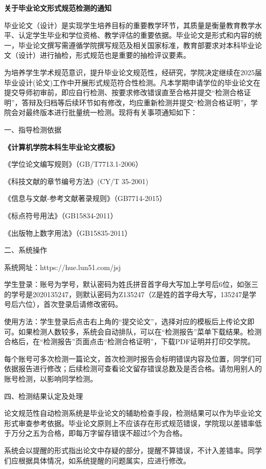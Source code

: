 \documentclass[
]{article}
\author{}
\date{}
\begin{document}
\textbf{关于毕业论文形式规范检测的通知}

毕业论文（设计）是实现学生培养目标的重要教学环节，其质量是衡量教育教学水平、认定学生毕业和学位资格、教学评估的重要依据。毕业论文是形式和内容的统一，毕业论文撰写需遵循学院撰写规范及相关国家标准，教育部要求对本科毕业论文（设计）进行抽检，形式规范也是重要的抽检评议要素。

为培养学生学术规范意识，提升毕业论文规范性，经研究，学院决定继续在2025届毕业设计(论文)工作中开展形式规范符合性检测。凡本学期申请学位的毕业论文在提交导师初审前，即应自行检测、按要求修改错误直至合格并提交``检测合格证明''，答辩及归档等后续环节如有修改，均应重新检测并提交``检测合格证明''，学院会对最终版本进行批量统一检测。现将有关事项通知如下：

一、指导检测依据

\textbf{《计算机学院本科生毕业论文模板》}

《学位论文编写规则》（GB/T7713.1-2006）

《科技文献的章节编号方法》(CY/T 35-2001)

《信息与文献-参考文献著录规则》（GB7714-2015）

《标点符号用法》（GB15834-2011）

《出版物上数字用法》（GB15835-2011）

二、系统操作

系统网址：https://hue.lun51.com/jsj

学生登录：账号为学号，默认密码为姓氏拼音首字母大写加上学号后6位，如张三的学号是2020135247，则默认密码为Z135247（Z是姓的首字母大写，135247是学号后六位），首次登录后请修改密码。

使用方法：学生登录后点击右上角的``提交论文''，选择对应的模板后上传论文即可。如果检测人数较多，系统会自动排队，可以在``检测报告''菜单下载结果。检测合格后，在``检测报告''页面点击``检测合格证明''，下载PDF证明并打印交学院。

每个账号可多次检测一篇论文，首次检测时报告会标明错误内容及位置，同学们可依据报告进行修改；后续检测可查看论文留存错误总数及是否合格。请勿用别人的账号检测，以影响同学检测。

四、检测结果认定及处理

论文规范性自动检测系统是毕业论文的辅助检查手段，检测结果可以作为毕业论文形式审查参考依据。毕业论文原则上不应该存在形式规范错误，学院现以差错率低于万分之五为合格，即每万字留存错误不超过5个为合格。

系统会以提醒的形式指出论文中存疑的部分，提醒不算错误，不计入差错率。同学们应根据具体情况，如系统提醒的问题属实，应进行修改。
\end{document}
